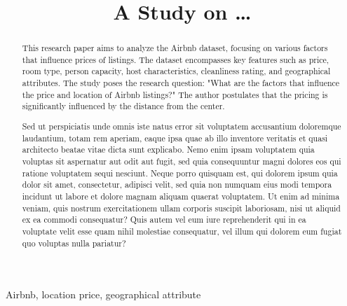 \documentclass[10pt, conference, compsocconf]{IEEEtran}
\begin{document}
\title{A Study on \dots}

\author{
}
\maketitle


\begin{abstract}
This research paper aims to analyze the Airbnb dataset, focusing on various factors that influence prices of listings. 
The dataset encompasses key features such as price, room type, person capacity, host characteristics, cleanliness rating, and geographical attributes. 
The study poses the research question: "What are the factors that influence the price and location of Airbnb listings?" 
The author postulates that the pricing is significantly influenced by the distance from the center.

Sed ut perspiciatis unde omnis iste natus error sit voluptatem accusantium doloremque laudantium, totam rem aperiam, eaque ipsa quae ab illo inventore veritatis et quasi architecto beatae vitae dicta sunt explicabo. 
Nemo enim ipsam voluptatem quia voluptas sit aspernatur aut odit aut fugit, sed quia consequuntur magni dolores eos qui ratione voluptatem sequi nesciunt. Neque porro quisquam est, qui dolorem ipsum quia dolor sit amet, consectetur, adipisci velit, sed quia non numquam eius modi tempora incidunt ut labore et dolore magnam aliquam quaerat voluptatem. 
Ut enim ad minima veniam, quis nostrum exercitationem ullam corporis suscipit laboriosam, nisi ut aliquid ex ea commodi consequatur? Quis autem vel eum iure reprehenderit qui in ea voluptate velit esse quam nihil molestiae consequatur, vel illum qui dolorem eum fugiat quo voluptas nulla pariatur?
\end{abstract}

\begin{IEEEkeywords}
Airbnb, location price, geographical attribute
\end{IEEEkeywords}
\end{document}
